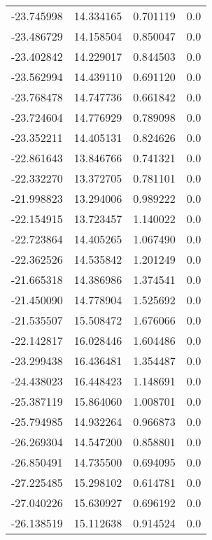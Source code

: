\begin{tabular}{rrrr}
      -23.745998 &        14.334165 &    0.701119 &   0.0 \\
      -23.486729 &        14.158504 &    0.850047 &   0.0 \\
      -23.402842 &        14.229017 &    0.844503 &   0.0 \\
      -23.562994 &        14.439110 &    0.691120 &   0.0 \\
      -23.768478 &        14.747736 &    0.661842 &   0.0 \\
      -23.724604 &        14.776929 &    0.789098 &   0.0 \\
      -23.352211 &        14.405131 &    0.824626 &   0.0 \\
      -22.861643 &        13.846766 &    0.741321 &   0.0 \\
      -22.332270 &        13.372705 &    0.781101 &   0.0 \\
      -21.998823 &        13.294006 &    0.989222 &   0.0 \\
      -22.154915 &        13.723457 &    1.140022 &   0.0 \\
      -22.723864 &        14.405265 &    1.067490 &   0.0 \\
      -22.362526 &        14.535842 &    1.201249 &   0.0 \\
      -21.665318 &        14.386986 &    1.374541 &   0.0 \\
      -21.450090 &        14.778904 &    1.525692 &   0.0 \\
      -21.535507 &        15.508472 &    1.676066 &   0.0 \\
      -22.142817 &        16.028446 &    1.604486 &   0.0 \\
      -23.299438 &        16.436481 &    1.354487 &   0.0 \\
      -24.438023 &        16.448423 &    1.148691 &   0.0 \\
      -25.387119 &        15.864060 &    1.008701 &   0.0 \\
      -25.794985 &        14.932264 &    0.966873 &   0.0 \\
      -26.269304 &        14.547200 &    0.858801 &   0.0 \\
      -26.850491 &        14.735500 &    0.694095 &   0.0 \\
      -27.225485 &        15.298102 &    0.614781 &   0.0 \\
      -27.040226 &        15.630927 &    0.696192 &   0.0 \\
      -26.138519 &        15.112638 &    0.914524 &   0.0 \\

\end{tabular}
